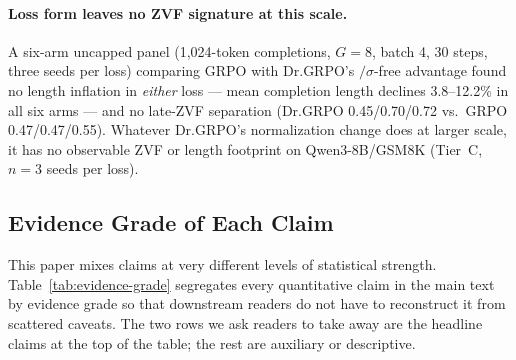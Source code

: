 \documentclass{article}
\begin{document}
\paragraph{Loss form leaves no ZVF signature at this scale.} A six-arm
uncapped panel (1{,}024-token completions, $G{=}8$, batch 4, 30 steps,
three seeds per loss) comparing GRPO with Dr.GRPO's $/\sigma$-free
advantage found no length inflation in \emph{either} loss --- mean
completion length declines 3.8--12.2\% in all six arms --- and no late-ZVF
separation (Dr.GRPO 0.45/0.70/0.72 vs.\ GRPO 0.47/0.47/0.55). Whatever
Dr.GRPO's normalization change does at larger scale, it has no observable
ZVF or length footprint on Qwen3-8B/GSM8K (Tier~C, $n{=}3$ seeds per
loss).

\subsection{Evidence Grade of Each Claim}
\label{sec:evidence-grade}
This paper mixes claims at very different levels of statistical strength.
Table~\ref{tab:evidence-grade} segregates every quantitative claim in the
main text by evidence grade so that downstream readers do not have to
reconstruct it from scattered caveats. The two rows we ask readers to take
away are the headline claims at the top of the table; the rest are
auxiliary or descriptive.
\end{document}
